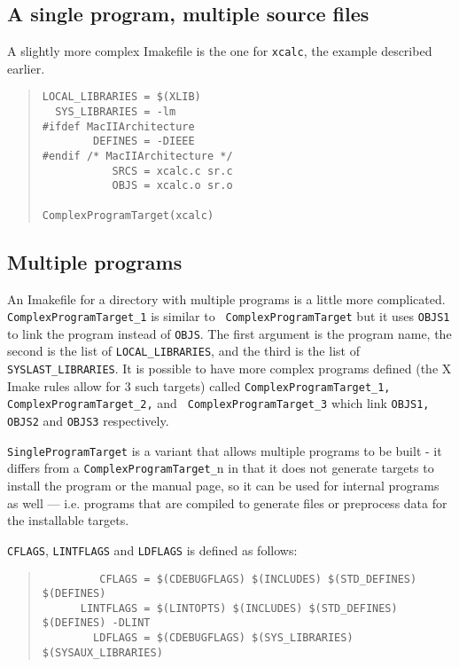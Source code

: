 \subsection{A single program, multiple source files}

A slightly more complex Imakefile is the one for {\tt xcalc}, the
example described earlier. 

\begin{quote}
\begin{verbatim}
LOCAL_LIBRARIES = $(XLIB)
  SYS_LIBRARIES = -lm
#ifdef MacIIArchitecture
        DEFINES = -DIEEE
#endif /* MacIIArchitecture */
           SRCS = xcalc.c sr.c
           OBJS = xcalc.o sr.o

ComplexProgramTarget(xcalc)
\end{verbatim}
\end{quote}

\subsection{Multiple programs}

An Imakefile for a directory with multiple programs is a little more
complicated. {\tt ComplexProgramTarget\_1} is similar to {\tt
ComplexProgramTarget} but it uses {\tt OBJS1} to link the program
instead of {\tt OBJS}. The first argument is the program name, the
second is the list of {\tt LOCAL\_LIBRARIES}, and the third is the list of
{\tt SYSLAST\_LIBRARIES}. It is possible to have more complex programs
defined (the X Imake rules allow for 3 such targets) called
{\tt ComplexProgramTarget\_1, ComplexProgramTarget\_2,} and {\tt
ComplexProgramTarget\_3} which link {\tt OBJS1, OBJS2} and {\tt OBJS3}
respectively.

{\tt SingleProgramTarget} is a variant that allows multiple programs
to be built - it differs from a {\tt ComplexProgramTarget\_}n in that
it does not generate targets to install the program or the manual
page, so it can be used for internal programs as well --- i.e.
programs that are compiled to generate files or preprocess data for
the installable targets.

{\tt CFLAGS}, {\tt LINTFLAGS} and {\tt LDFLAGS} is defined as follows:
\begin{quote}
\begin{verbatim}
         CFLAGS = $(CDEBUGFLAGS) $(INCLUDES) $(STD_DEFINES) $(DEFINES)
      LINTFLAGS = $(LINTOPTS) $(INCLUDES) $(STD_DEFINES) $(DEFINES) -DLINT
        LDFLAGS = $(CDEBUGFLAGS) $(SYS_LIBRARIES) $(SYSAUX_LIBRARIES)
\end{verbatim}
\end{quote} 

